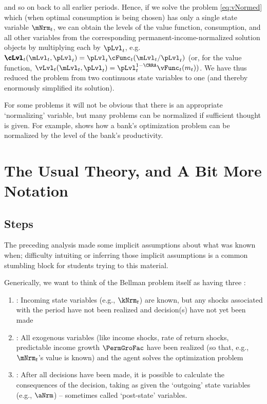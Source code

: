 \documentclass[titlepage, headings=optiontotocandhead]{\econtex}
\begin{document}
and so on back to all earlier periods.  Hence, if we solve the problem \eqref{eq:vNormed}
which (when optimal consumption is being chosen) has only a single state variable $\mNrm_{t}$, we can obtain the levels of the value function, consumption, and all other variables
from the corresponding permanent-income-normalized solution objects by multiplying each by $\pLvl_{t}$, e.g.\ ${\pmb{\cLvl}}
_{t}(\mLvl_{t},\pLvl_{t})=\pLvl_{t}\cFunc_{t}(\mLvl_{t}/\pLvl_{t})$ (or, for the value function, ${\vLvl}
_{t}({\mLvl}_{t},\pLvl_{t}) = \pLvl_{t}^{1-\CRRA}\vFunc_{t}({m}_{t}))$.  We have thus reduced the
problem from two continuous state variables to one (and thereby enormously simplified its solution).

For some problems it will not be obvious that there is an appropriate `normalizing' variable, but many problems can be normalized if sufficient thought is given.  For example, \cite{valencia:2006} shows how a bank's optimization problem can be normalized by the level of the bank's productivity.


\hypertarget{The-Usual-Theory}{}
\section{The Usual Theory, and A Bit More Notation}
\label{sec:usualtheory}

\subsection{Steps}

  The preceding analysis made some implicit assumptions about what was known when; difficulty intuiting or inferring those implicit assumptions is a common stumbling block for students trying to this material.

Generically, we want to think of the Bellman problem itself as having three {\moves}:
\begin{enumerate}
\item \textbf{\Arrival}: Incoming state variables (e.g., $\kNrm_{t}$) are known, but any shocks associated with the period have not been realized and decision(s) have not yet been made
\item \textbf{\Decision}: All exogenous variables (like income shocks, rate of return shocks, predictable income growth $\PermGroFac$ have been realized (so that, e.g., $\mNrm_{t}$'s value is known) and the agent solves the optimization problem
  \item \textbf{\Continuation}: After all decisions have been made, it is possible to calculate the consequences of the decision, taking as given the `outgoing' state variables (e.g., $\aNrm$) -- sometimes called `post-state' variables.
  \end{enumerate}
\end{document}
